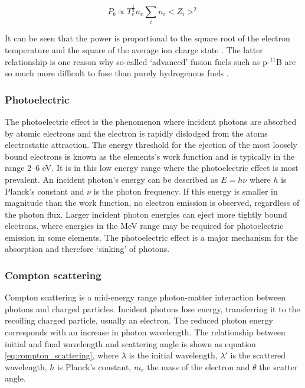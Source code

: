 \begin{equation}
  \label{eq:bremsstrahlung}
  P_{b} \propto T_{e}^{\frac{1}{2}} n_{e} \sum_{i} n_{i} <Z_{i}>^{2}
\end{equation}

It can be seen that the power is proportional to the square root of the electron temperature and the square of the average ion charge state \cite{schuster2017}. The latter relationship is one reason why so-called `advanced' fusion fuels such as p-$^{11}$B are so much more difficult to fuse than purely hydrogenous fuels \cite{rider1995}.

\subsubsection{Photoelectric}
The photoelectric effect is the phenomenon where incident photons are absorbed by atomic electrons and the electron is rapidly dislodged from the atoms electrostatic attraction. The energy threshold for the ejection of the most loosely bound electrons is known as the elements's work function and is typically in the range 2--6 eV. It is in this low energy range where the photoelectric effect is most prevalent. An incident photon's energy can be described as $E=h\nu$ where $h$ is Planck's constant and $\nu$ is the photon frequency. If this energy is smaller in magnitude than the work function, no electron emission is observed, regardless of the photon flux. Larger incident photon energies can eject more tightly bound electrons, where energies in the MeV range may be required for photoelectric emission in some elements. The photoelectric effect is a major mechanism for the absorption and therefore `sinking' of photons.

\subsubsection{Compton scattering}
Compton scattering is a mid-energy range photon-matter interaction between photons and charged particles. Incident photons lose energy, transferring it to the recoiling charged particle, usually an electron. The reduced photon energy corresponds with an increase in photon wavelength. The relationship between initial and final wavelength and scattering angle is shown as equation \ref{eq:compton_scattering}, where $\lambda$ is the initial wavelength, $\lambda'$ is the scattered wavelength, $h$ is Planck's constant, $m_{e}$ the mass of the electron and $\theta$ the scatter angle.

